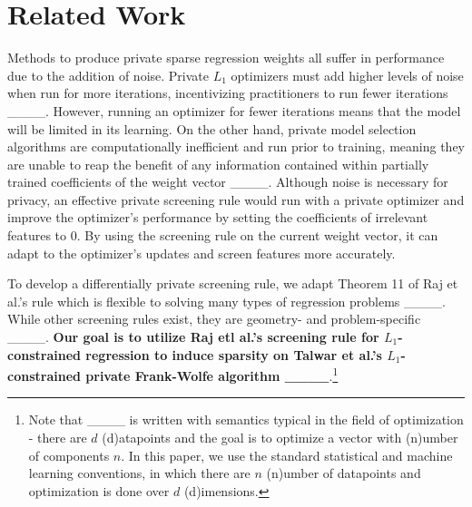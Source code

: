 \section{Related Work}
Methods to produce private sparse regression weights all suffer in performance due to the addition of noise. Private $L_1$ optimizers must add higher levels of noise when run for more iterations, incentivizing practitioners to run fewer iterations ____. However, running an optimizer for fewer iterations means that the model will be limited in its learning. On the other hand, private model selection algorithms are computationally inefficient and run prior to training, meaning they are unable to reap the benefit of any information contained within partially trained coefficients of the weight vector ____. Although noise is necessary for privacy, an effective private screening rule would run with a private optimizer and improve the optimizer's performance by setting the coefficients of irrelevant features to 0. By using the screening rule on the current weight vector, it can adapt to the optimizer's updates and screen features more accurately. 

%

To develop a differentially private screening rule, we adapt Theorem 11 of Raj et al.'s rule which is flexible to solving many types of regression problems ____. While other screening rules exist, they are geometry- and problem-specific ____. \textbf{Our goal is to utilize Raj etl al.'s screening rule for $L_1$-constrained regression to induce sparsity on Talwar et al.'s $L_1$-constrained private Frank-Wolfe algorithm ____}.\footnote{Note that ____ is written with semantics typical in the field of optimization - there are $d$ (d)atapoints and the goal is to optimize a vector with (n)umber of components $n$. In this paper, we use the standard statistical and machine learning conventions, in which there are $n$ (n)umber of datapoints and optimization is done over $d$ (d)imensions.}

